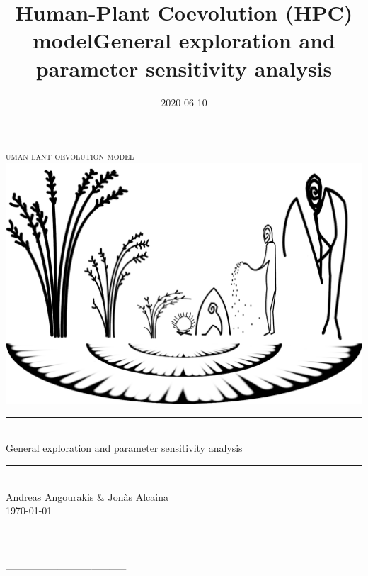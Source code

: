\documentclass[
]{book}
\title{Human-Plant Coevolution (HPC) modelGeneral exploration and parameter sensitivity analysis}
\author{}
\date{\vspace{-2.5em}2020-06-10}
\begin{document}
\maketitle

\newcommand{\HRule}{\rule{\linewidth}{0.5mm}}


\begin{center}

\textsc{\LARGE
{}uman-lant oevolution model} 
\\[1cm]
\includegraphics[width=\textwidth]{images/hpcModel-logo_v2.png}
\\[1.5cm]
\HRule \\[0.4cm]
{ \huge General exploration and parameter sensitivity analysis \\[0.15cm] }
\HRule \\[1.5cm]
Andreas Angourakis \& Jon\`{a}s Alcaina
\\[1cm]
\today \\ [1cm]

\end{center}

\newpage
{}

{
\hypersetup{linkcolor=}
\setcounter{tocdepth}{1}
\tableofcontents
}
\hypertarget{section}{%
\chapter*{\_\_\_\_\_\_\_}\label{section}}
\end{document}

